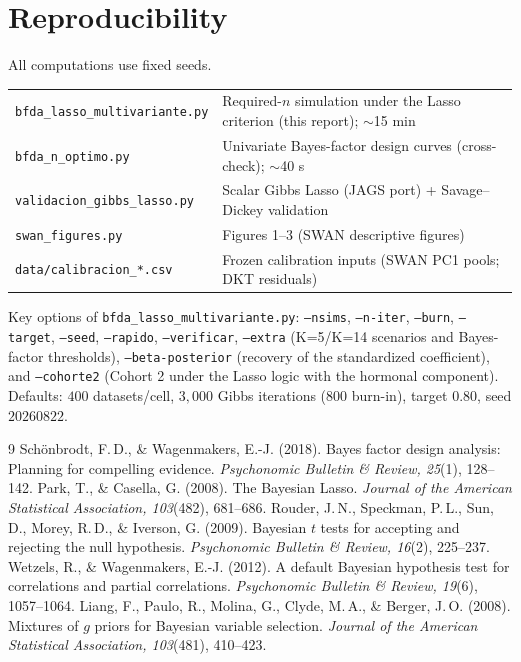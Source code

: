 \documentclass[11pt,a4paper]{article}
\begin{document}
\section{Reproducibility}

All computations use fixed seeds.

\begin{table}[H]
\centering\small
\begin{tabular}{ll}
\toprule
\texttt{bfda\_lasso\_multivariante.py} & Required-$n$ simulation under the Lasso criterion (this report); $\sim$15 min\\
\texttt{bfda\_n\_optimo.py} & Univariate Bayes-factor design curves (cross-check); $\sim$40 s\\
\texttt{validacion\_gibbs\_lasso.py} & Scalar Gibbs Lasso (JAGS port) + Savage--Dickey validation\\
\texttt{swan\_figures.py} & Figures 1--3 (SWAN descriptive figures)\\
\texttt{data/calibracion\_*.csv} & Frozen calibration inputs (SWAN PC1 pools; DKT residuals)\\
\bottomrule
\end{tabular}
\end{table}

Key options of \texttt{bfda\_lasso\_multivariante.py}: \texttt{--nsims}, \texttt{--n-iter}, \texttt{--burn}, \texttt{--target}, \texttt{--seed}, \texttt{--rapido}, \texttt{--verificar}, \texttt{--extra} (K=5/K=14 scenarios and Bayes-factor thresholds), \texttt{--beta-posterior} (recovery of the standardized coefficient), and \texttt{--cohorte2} (Cohort 2 under the Lasso logic with the hormonal component). Defaults: $400$ datasets/cell, $3{,}000$ Gibbs iterations ($800$ burn-in), target $0.80$, seed $20260822$.

\begin{thebibliography}{9}\small
{} Sch\"onbrodt, F.\,D., \& Wagenmakers, E.-J. (2018). Bayes factor design analysis: Planning for compelling evidence. \emph{Psychonomic Bulletin \& Review, 25}(1), 128--142.
 Park, T., \& Casella, G. (2008). The Bayesian Lasso. \emph{Journal of the American Statistical Association, 103}(482), 681--686.
 Rouder, J.\,N., Speckman, P.\,L., Sun, D., Morey, R.\,D., \& Iverson, G. (2009). Bayesian $t$ tests for accepting and rejecting the null hypothesis. \emph{Psychonomic Bulletin \& Review, 16}(2), 225--237.
 Wetzels, R., \& Wagenmakers, E.-J. (2012). A default Bayesian hypothesis test for correlations and partial correlations. \emph{Psychonomic Bulletin \& Review, 19}(6), 1057--1064.
 Liang, F., Paulo, R., Molina, G., Clyde, M.\,A., \& Berger, J.\,O. (2008). Mixtures of $g$ priors for Bayesian variable selection. \emph{Journal of the American Statistical Association, 103}(481), 410--423.
\end{thebibliography}
\end{document}
